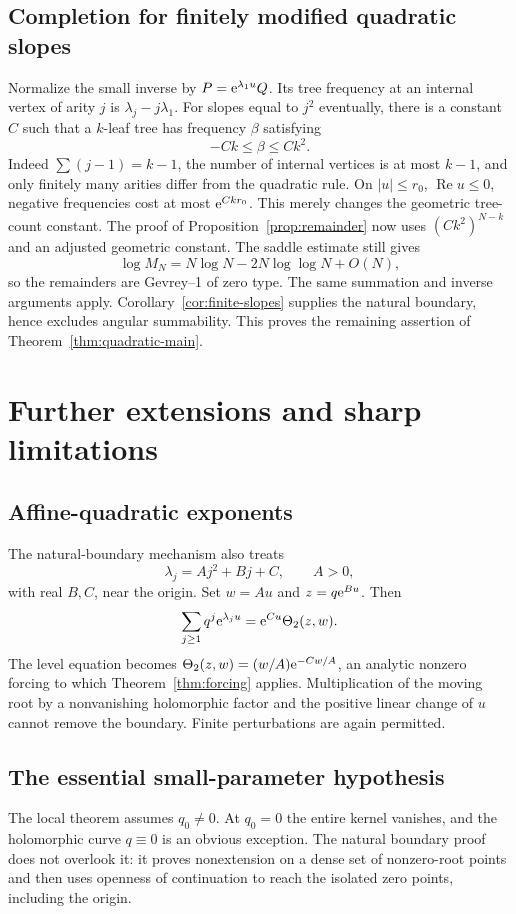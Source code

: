 \documentclass[11pt,a4paper]{article}
\numberwithin{equation}{section}
\theoremstyle{definition}\newtheorem{definition}[theorem]{Definition}
\theoremstyle{remark}\newtheorem{remark}[theorem]{Remark}
\theoremstyle{definition}
\newcommand{\Rea}{\operatorname{Re}}\newcommand{\Ima}{\operatorname{Im}}
\begin{document}
\subsection{Completion for finitely modified quadratic slopes}
Normalize the small inverse by $P=\mathrm e^{\lambda_1u}Q$. Its tree frequency at an
internal vertex of arity $j$ is $\lambda_j-j\lambda_1$.
For slopes equal to $j^2$ eventually, there is a constant $C$ such that a
$k$-leaf tree has frequency $\beta$ satisfying
\[
 -Ck\le\beta\le Ck^2.
\]
Indeed $\sum(j-1)=k-1$, the number of internal vertices is at most $k-1$,
and only finitely many arities differ from the quadratic rule.
On $|u|\le r_0$, $\Rea u\le0$, negative frequencies cost at most
$\mathrm e^{Ckr_0}$. This merely changes the geometric tree-count constant.
The proof of Proposition~\ref{prop:remainder} now uses $(Ck^2)^{N-k}$ and
an adjusted geometric constant. The saddle estimate still gives
\[
 \log M_N=N\log N-2N\log\log N+O(N),
\]
so the remainders are Gevrey--1 of zero type. The same summation and inverse
arguments apply. Corollary~\ref{cor:finite-slopes} supplies the natural
boundary, hence excludes angular summability. This proves the remaining
assertion of Theorem~\ref{thm:quadratic-main}.

\section{Further extensions and sharp limitations}
\label{sec:extensions}
\subsection{Affine-quadratic exponents}
The natural-boundary mechanism also treats
\[
 \lambda_j=A j^2+Bj+C,\qquad A>0,
\]
with real $B,C$, near the origin. Set $w=Au$ and $z=q\mathrm e^{Bu}$.
Then
\[
 \sum_{j\ge1}q^j\mathrm e^{\lambda_j u}
 =\mathrm e^{Cu}\Theta_2(z,w).
\]
The level equation becomes
$\Theta_2(z,w)=(w/A)\mathrm e^{-Cw/A}$, an analytic nonzero forcing to which
Theorem~\ref{thm:forcing} applies. Multiplication of the moving root by a
nonvanishing holomorphic factor and the positive linear change of $u$ cannot
remove the boundary. Finite perturbations are again permitted.

\subsection{The essential small-parameter hypothesis}
The local theorem assumes $q_0\ne0$. At $q_0=0$ the entire kernel vanishes,
and the holomorphic curve $q\equiv0$ is an obvious exception. The natural
boundary proof does not overlook it: it proves nonextension on a dense set
of nonzero-root points and then uses openness of continuation to reach the
isolated zero points, including the origin.
\end{document}
